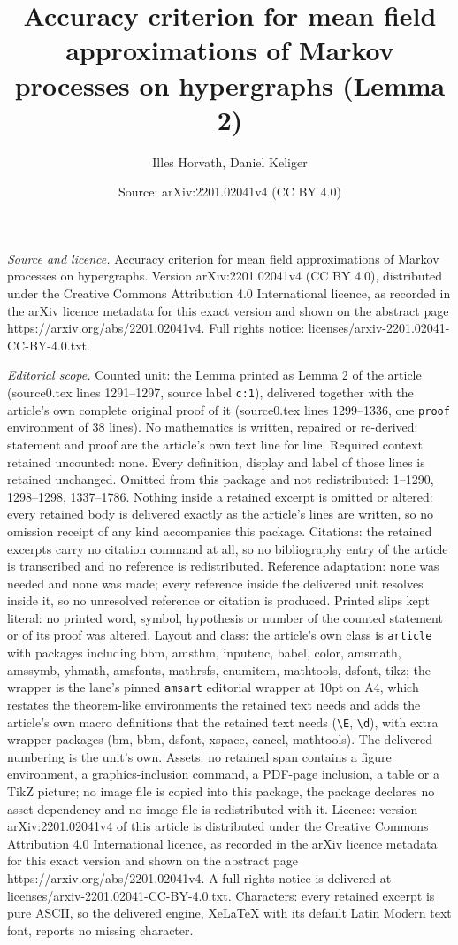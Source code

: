 \documentclass[10pt,a4paper]{amsart}
\title[Accuracy criterion for mean field approximations of Markov p]{Accuracy criterion for mean field approximations of Markov processes on hypergraphs (Lemma 2)}
\author{Illes Horvath, Daniel Keliger}
\date{Source: arXiv:2201.02041v4 (CC BY 4.0)}
\begin{document}
\maketitle

\noindent\emph{Source and licence.} Accuracy criterion for mean field approximations of Markov processes on hypergraphs. Version arXiv:2201.02041v4 (CC BY 4.0), distributed under the Creative Commons Attribution 4.0 International licence, as recorded in the arXiv licence metadata for this exact version and shown on the abstract page https://arxiv.org/abs/2201.02041v4. Full rights notice: licenses/arxiv-2201.02041-CC-BY-4.0.txt.\par\smallskip

\noindent\textit{Editorial scope.} Counted unit: the Lemma printed as Lemma 2 of the article (source0.tex lines 1291--1297, source label \texttt{c:1}), delivered together with the article's own complete original proof of it (source0.tex lines 1299--1336, one \texttt{proof} environment of 38 lines). No mathematics is written, repaired or re-derived: statement and proof are the article's own text line for line. Required context retained uncounted: none. Every definition, display and label of those lines is retained unchanged. Omitted from this package and not redistributed: 1--1290, 1298--1298, 1337--1786. Nothing inside a retained excerpt is omitted or altered: every retained body is delivered exactly as the article's lines are written, so no omission receipt of any kind accompanies this package. Citations: the retained excerpts carry no citation command at all, so no bibliography entry of the article is transcribed and no reference is redistributed. Reference adaptation: none was needed and none was made; every reference inside the delivered unit resolves inside it, so no unresolved reference or citation is produced. Printed slips kept literal: no printed word, symbol, hypothesis or number of the counted statement or of its proof was altered. Layout and class: the article's own class is \texttt{article} with packages including bbm, amsthm, inputenc, babel, color, amsmath, amssymb, yhmath, amsfonts, mathrsfs, enumitem, mathtools, dsfont, tikz; the wrapper is the lane's pinned \texttt{amsart} editorial wrapper at 10pt on A4, which restates the theorem-like environments the retained text needs and adds the article's own macro definitions that the retained text needs (\texttt{\textbackslash E}, \texttt{\textbackslash d}), with extra wrapper packages (bm, bbm, dsfont, xspace, cancel, mathtools). The delivered numbering is the unit's own. Assets: no retained span contains a figure environment, a graphics-inclusion command, a PDF-page inclusion, a table or a TikZ picture; no image file is copied into this package, the package declares no asset dependency and no image file is redistributed with it. Licence: version arXiv:2201.02041v4 of this article is distributed under the Creative Commons Attribution 4.0 International licence, as recorded in the arXiv licence metadata for this exact version and shown on the abstract page https://arxiv.org/abs/2201.02041v4. A full rights notice is delivered at licenses/arxiv-2201.02041-CC-BY-4.0.txt. Characters: every retained excerpt is pure ASCII, so the delivered engine, XeLaTeX with its default Latin Modern text font, reports no missing character.
\end{document}

